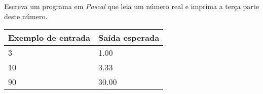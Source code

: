\item Escreva um programa em \emph{Pascal} que leia um número real e imprima a 
terça parte deste número.

\begin{center}
\begin{tabular}{|l|l|} \hline
Exemplo de entrada & Saída esperada \\ \hline
3               & 1.00 \\ \hline
10              & 3.33  \\ \hline
90              & 30.00 \\ \hline
\end{tabular}
\end{center}